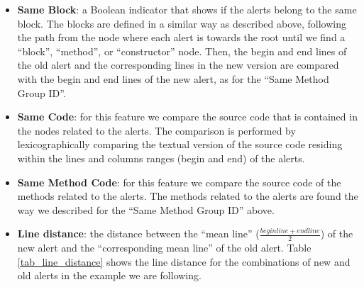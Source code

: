 \documentclass[
]{article}
\begin{document}
\begin{itemize}
\noindent
\item \textbf{Same Block}: a Boolean indicator that shows if the alerts belong to the
same block. The blocks are defined in a similar way as described above, following
the path from the node where each alert is towards the root until we find a ``block'', 
``method'', or ``constructor'' node. Then, the begin and end lines 
of the old alert and the corresponding lines in the new version are compared with
the begin and end lines of the new alert, as for the ``Same Method Group ID''.

\noindent
\item \textbf{Same Code}: for this feature we compare the source code that is
contained in the nodes related to the alerts. The comparison is performed
by lexicographically comparing the textual version of the source code 
residing within the lines and columns ranges (begin and end) of the alerts.

\noindent
\item \textbf{Same Method Code}: for this feature we compare the source code of the methods related to
the alerts. The methods related to the alerts are found the way we described for the ``Same Method 
Group ID'' above.

\noindent
\item \textbf{Line distance}: the distance between the ``mean line'' (\(\frac{beginline + endline}{2}\)) of the new alert and the ``corresponding mean line'' of the old alert. 
Table \ref{tab_line_distance} shows the line distance for the combinations of
new and old alerts in the example we are following.

\small
\begin{table}[H]
\caption{\label{tab:unnamed-chunk-12}Line distance feature \label{tab_line_distance}}
\centering
{}
\end{table}


\end{itemize}
\end{document}
